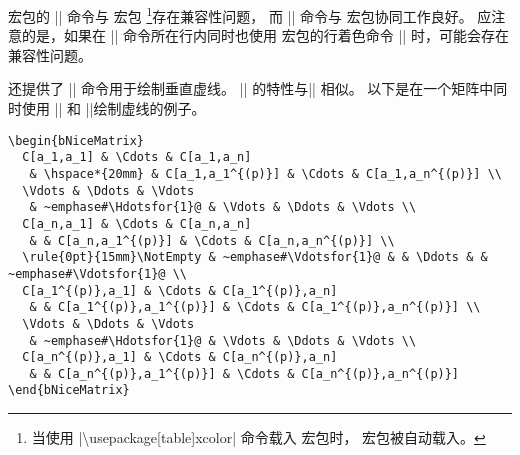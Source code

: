 \documentclass[dvipsnames]{article}%
\begin{document}
\bigskip
 宏包的 |\hdotsfor| 命令与  宏包
\footnote{当使用 |\textbackslash usepackage[table]{xcolor}| 命令载入  宏包时， 宏包被自动载入。}存在兼容性问题，
而 |\Hdotsfor| 命令与  宏包协同工作良好。
应注意的是，如果在 |\Hdotsfor| 命令所在行内同时也使用  宏包的行着色命令 |\rowcolor| 时，可能会存在兼容性问题。

\bigskip
  还提供了 |\Vdotsfor| 命令用于绘制垂直虚线。
  |\Vdotsfor| 的特性与|\Hdotsfor| 相似。
\bigskip
以下是在一个矩阵中同时使用 |\Hdotsfor| 和 |\Vdotsfor|绘制虚线的例子。

\begin{Verbatim}[formatcom=\small\color{gray}]
\begin{bNiceMatrix}
  C[a_1,a_1] & \Cdots & C[a_1,a_n] 
   & \hspace*{20mm} & C[a_1,a_1^{(p)}] & \Cdots & C[a_1,a_n^{(p)}] \\
  \Vdots & \Ddots & \Vdots 
   & ~emphase#\Hdotsfor{1}@ & \Vdots & \Ddots & \Vdots \\ 
  C[a_n,a_1] & \Cdots & C[a_n,a_n] 
   & & C[a_n,a_1^{(p)}] & \Cdots & C[a_n,a_n^{(p)}] \\
  \rule{0pt}{15mm}\NotEmpty & ~emphase#\Vdotsfor{1}@ & & \Ddots & & ~emphase#\Vdotsfor{1}@ \\
  C[a_1^{(p)},a_1] & \Cdots & C[a_1^{(p)},a_n] 
   & & C[a_1^{(p)},a_1^{(p)}] & \Cdots & C[a_1^{(p)},a_n^{(p)}] \\
  \Vdots & \Ddots & \Vdots 
   & ~emphase#\Hdotsfor{1}@ & \Vdots & \Ddots & \Vdots \\ 
  C[a_n^{(p)},a_1] & \Cdots & C[a_n^{(p)},a_n] 
   & & C[a_n^{(p)},a_1^{(p)}] & \Cdots & C[a_n^{(p)},a_n^{(p)}]
\end{bNiceMatrix}
\end{Verbatim}
\end{document}
